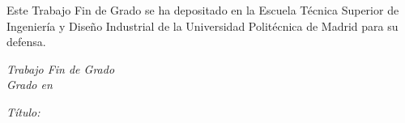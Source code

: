 \begin{titlepage}
  \newpage
  \thispagestyle{empty}
  \noindent
  Este Trabajo Fin de Grado se ha depositado en la Escuela Técnica Superior de Ingeniería y Diseño Industrial de la Universidad Politécnica de Madrid para su defensa.

  \vspace*{4cm}
  \noindent
  \textit{Trabajo Fin de Grado}\\
  \textit{Grado en} \Grado{}
  
  \textit{Título:} \TituloTFG{}

  \FechaLectura

  \vspace*{3cm}

\end{titlepage}
